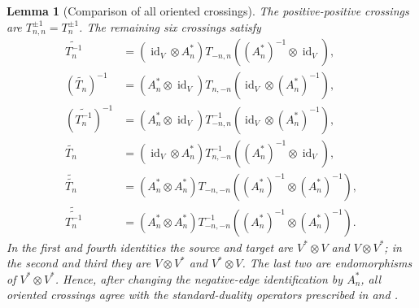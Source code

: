 \documentclass[11pt,a4paper]{article}
\newcommand{\ot}{\otimes}
\newcommand{\id}{\operatorname{id}}
\newtheorem{lemma}[theorem]{Lemma}
\theoremstyle{definition}
\theoremstyle{remark}
\begin{document}
\begin{lemma}[Comparison of all oriented crossings]
\label{lem:partial-transpose}
The positive-positive crossings are \(T_{n,n}^{\pm1}=T_n^{\pm1}\).
The remaining six crossings satisfy
\begin{align}
 \widetilde{T_n^{-1}}
 &=(\id_V\ot A_n^*)T_{-n,n}
 ((A_n^*)^{-1}\ot\id_V)
 ,\label{eq:standard-negative-positive}\\
 (\widetilde{T_n})^{-1}
 &=(A_n^*\ot\id_V)T_{n,-n}
 (\id_V\ot(A_n^*)^{-1})
 ,
 \label{eq:standard-positive-negative}\\
 (\widetilde{T_n^{-1}})^{-1}
 &=(A_n^*\ot\id_V)T_{-n,n}^{-1}
 (\id_V\ot(A_n^*)^{-1})
 ,
 \label{eq:standard-negative-positive-inverse}\\
 \widetilde{T_n}
 &=(\id_V\ot A_n^*)T_{n,-n}^{-1}
 ((A_n^*)^{-1}\ot\id_V)
 ,
 \label{eq:standard-positive-negative-inverse}\\
 \widetilde{\widetilde{T_n}}
 &=(A_n^*\ot A_n^*)T_{-n,-n}
 ((A_n^*)^{-1}\ot(A_n^*)^{-1})
 ,
 \label{eq:standard-negative-negative}\\
 \widetilde{\widetilde{T_n^{-1}}}
 &=(A_n^*\ot A_n^*)T_{-n,-n}^{-1}
 ((A_n^*)^{-1}\ot(A_n^*)^{-1})
 .
 \label{eq:standard-negative-negative-inverse}
\end{align}
In the first and fourth identities the source and target are
\(V^*\ot V\) and \(V\ot V^*\); in the second and third they are
\(V\ot V^*\) and \(V^*\ot V\).  The last two are endomorphisms of
\(V^*\ot V^*\).
Hence, after changing the negative-edge identification by \(A_n^*\),
all oriented crossings agree with the standard-duality operators
prescribed in \cite[Section~2]{GK} and
\cite[Section~2, equations~(16)--(19)]{KashaevLong}.
\end{lemma}
\end{document}
